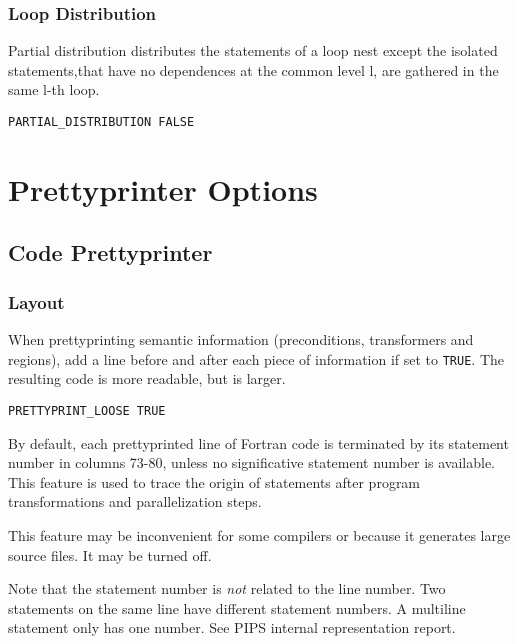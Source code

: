 \subsubsection{Loop Distribution}

Partial distribution distributes the statements of a loop nest except
 the isolated statements,that have no dependences at the common level l,
 are gathered in the same l-th loop.

\begin{verbatim}
PARTIAL_DISTRIBUTION FALSE
\end{verbatim}




\section{Prettyprinter Options}
\label{section-prettyprinters}

\subsection{Code Prettyprinter}

\subsubsection{Layout}

When prettyprinting semantic information (preconditions, transformers and
regions), add a line before and after each piece of information if set to
\verb+TRUE+. The resulting code is more readable, but is larger.  

\begin{verbatim}
PRETTYPRINT_LOOSE TRUE 
\end{verbatim}

By default, each prettyprinted line of Fortran code is terminated by its
statement number in columns 73-80, unless no significative statement
number is available. This feature is used to trace the origin of
statements after program transformations and parallelization steps.

This feature may be inconvenient for some compilers or because it
generates large source files. It may be turned off.

Note that the statement number is {\em not} related to the line
number. Two statements on the same line have different statement
numbers. A multiline statement only has one number. See PIPS internal
representation report. 

